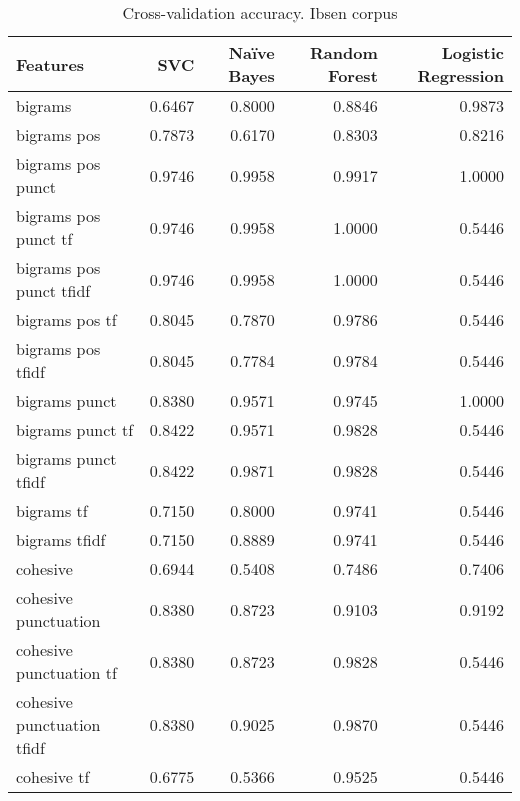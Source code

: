 \documentclass{article}
\begin{document}
\begin{table}
\centering
\caption{Cross-validation accuracy. Ibsen corpus}
\begin{tabular}{lrrrr}
\toprule
{Features} &    SVC &  Naïve Bayes &  Random Forest &  Logistic Regression \\
\midrule
bigrams                    & 0.6467 &       0.8000 &         0.8846 &               0.9873 \\
bigrams pos                & 0.7873 &       0.6170 &         0.8303 &               0.8216 \\
bigrams pos punct          & 0.9746 &       0.9958 &         0.9917 &               1.0000 \\
bigrams pos punct tf       & 0.9746 &       0.9958 &         1.0000 &               0.5446 \\
bigrams pos punct tfidf    & 0.9746 &       0.9958 &         1.0000 &               0.5446 \\
bigrams pos tf             & 0.8045 &       0.7870 &         0.9786 &               0.5446 \\
bigrams pos tfidf          & 0.8045 &       0.7784 &         0.9784 &               0.5446 \\
bigrams punct              & 0.8380 &       0.9571 &         0.9745 &               1.0000 \\
bigrams punct tf           & 0.8422 &       0.9571 &         0.9828 &               0.5446 \\
bigrams punct tfidf        & 0.8422 &       0.9871 &         0.9828 &               0.5446 \\
bigrams tf                 & 0.7150 &       0.8000 &         0.9741 &               0.5446 \\
bigrams tfidf              & 0.7150 &       0.8889 &         0.9741 &               0.5446 \\
cohesive                   & 0.6944 &       0.5408 &         0.7486 &               0.7406 \\
cohesive punctuation       & 0.8380 &       0.8723 &         0.9103 &               0.9192 \\
cohesive punctuation tf    & 0.8380 &       0.8723 &         0.9828 &               0.5446 \\
cohesive punctuation tfidf & 0.8380 &       0.9025 &         0.9870 &               0.5446 \\
cohesive tf                & 0.6775 &       0.5366 &         0.9525 &               0.5446 \\

\end{tabular}
\end{table}
\end{document}
